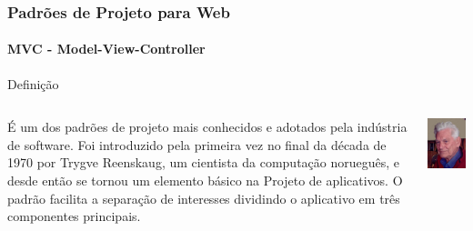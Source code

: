 \documentclass[
	9pt, %
	t, %
]{beamer}
\begin{document}
\begin{frame}
	\frametitle{Padrões de Projeto para Web}
	\framesubtitle{MVC - Model-View-Controller}

	\begin{block}{Definição}
		\begin{columns}[c] %
			\begin{column}{0.8\textwidth} %
				É um dos padrões de projeto mais conhecidos e adotados pela indústria de software. Foi introduzido pela primeira vez no final da década de 1970 por Trygve Reenskaug, um cientista da computação norueguês, e desde então se tornou um elemento básico na Projeto de aplicativos. O padrão facilita a separação de interesses dividindo o aplicativo em três componentes principais.
			\end{column}

			\begin{column}{0.2\textwidth} %
				\includegraphics[width=0.9\linewidth]{Images/reenskaug.jpg}
			\end{column}
		\end{columns}
	\end{block}

\end{frame}
\end{document}
